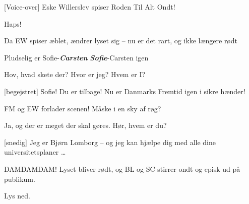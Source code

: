 \documentclass[a4paper,11pt]{article}
\begin{document}
\begin{sketch}
[Voice-over] Eske Willerslev spiser Roden Til Alt Ondt!

 Haps! 

\scene Da EW spiser æblet, ændrer lyset sig -- nu er det rart, og ikke længere rødt

\scene Pludselig er Sofie-\emph{\textbf{Carsten}} \emph{\textbf{Sofie}}-Carsten igen

 Hov, hvad skete der? Hvor er jeg? Hvem er I?

[begejstret] Sofie! Du er tilbage! Nu er Danmarks Fremtid igen i sikre hænder!

\scene FM og EW forlader scenen! Måske i en sky af røg? 

 Ja, og der er meget der skal gøres.  Hør, hvem er du? 

[snedig] Jeg er Bjørn Lomborg -- og jeg kan hjælpe dig med alle dine universitetsplaner \ldots 

\scene  DAMDAMDAM! Lyset bliver rødt, og BL og SC stirrer ondt og episk ud på publikum.

\scene  Lys ned.


\end{sketch}
\end{document}
